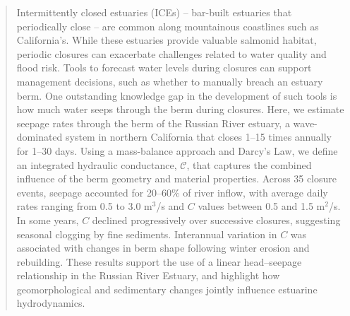 \documentclass[preprint,12pt,authoryear]{elsarticle}
\makeatletter
\providecommand{\DIFaddtex}[1]{{\protect\color{blue}\uwave{#1}}} %
\providecommand{\DIFdeltex}[1]{{\protect\color{red}\sout{#1}}} %
\providecommand{\DIFaddbegin}{} %
\providecommand{\DIFaddend}{} %
\providecommand{\DIFdelbegin}{} %
\providecommand{\DIFdelend}{} %
\providecommand{\DIFadd}[1]{\texorpdfstring{\DIFaddtex{#1}}{#1}} %
\providecommand{\DIFdel}[1]{\texorpdfstring{\DIFdeltex{#1}}{}} %
\newcommand{\DIFscaledelfig}{0.5}
\newlength{\DIFdelgraphicswidth} %
\newlength{\DIFdelgraphicsheight} %
\newcommand{\DIFaddincludegraphics}[2][]{{\color{blue}\fbox{\DIFOincludegraphics[#1]{#2}}}} %
\newcommand{\DIFdelincludegraphics}[2][]{%
\sbox{\DIFdelgraphicsbox}{\DIFOincludegraphics[#1]{#2}}%
\settoboxwidth{\DIFdelgraphicswidth}{\DIFdelgraphicsbox} %
\settoboxtotalheight{\DIFdelgraphicsheight}{\DIFdelgraphicsbox} %
\scalebox{\DIFscaledelfig}{%
\parbox[b]{\DIFdelgraphicswidth}{\usebox{\DIFdelgraphicsbox}\\[-\baselineskip] \rule{\DIFdelgraphicswidth}{0em}}\llap{\resizebox{\DIFdelgraphicswidth}{\DIFdelgraphicsheight}{%
\setlength{\unitlength}{\DIFdelgraphicswidth}%
\begin{picture}(1,1)%
\thicklines\linethickness{2pt} %
{\color[rgb]{1,0,0}\put(0,0){\framebox(1,1){}}}%
{\color[rgb]{1,0,0}\put(0,0){\line( 1,1){1}}}%
{\color[rgb]{1,0,0}\put(0,1){\line(1,-1){1}}}%
\end{picture}%
}\hspace*{3pt}}} %
} %
\DeclareRobustCommand{\DIFaddbegin}{\DIFOaddbegin \let\includegraphics\DIFaddincludegraphics} %
\DeclareRobustCommand{\DIFaddend}{\DIFOaddend \let\includegraphics\DIFOincludegraphics} %
\DeclareRobustCommand{\DIFdelbegin}{\DIFOdelbegin \let\includegraphics\DIFdelincludegraphics} %
\DeclareRobustCommand{\DIFdelend}{\DIFOaddend \let\includegraphics\DIFOincludegraphics} %
\let\sout@orig\sout %
\renewcommand{\sout}[1]{\ifmmode\text{\sout@orig{\ensuremath{#1}}}\else\sout@orig{#1}\fi} %
\makeatother
\begin{document}
\begin{frontmatter}
\begin{abstract}

 
 Intermittently closed estuaries (ICEs) -- bar-built estuaries that periodically close --  are common along mountainous coastlines such as California's. While these estuaries provide valuable salmonid habitat, periodic closures can exacerbate challenges related to water quality and flood risk. Tools to forecast water levels during closures can support management decisions, such as whether to manually breach an estuary berm. One outstanding knowledge gap in the development of such tools is how much water seeps through the berm during closures.
Here, we estimate seepage rates through the berm of the Russian River estuary, a wave-dominated system in northern California that closes 1–15 times annually for 1–30 days. Using a mass-balance approach and Darcy’s Law, we define an integrated hydraulic conductance, \DIFdelbegin \DIFdel{$\mathcal{C}$}\DIFdelend \DIFaddbegin \DIFadd{$C$}\DIFaddend , that captures the combined influence of the berm geometry and material properties. Across 35 closure events, seepage accounted for 20–60\% of river inflow, with average daily rates ranging from 0.5 to 3.0 m$^3$/s and $C$ values between 0.5 and 1.5 m$^2$/s. In some years, $C$ declined progressively over successive closures, suggesting seasonal clogging by fine sediments. Interannual variation in $C$ was associated with changes in berm shape following winter erosion and rebuilding. These results support the use of a linear head–seepage relationship in the Russian River Estuary, and highlight how geomorphological and sedimentary changes jointly influence estuarine hydrodynamics.


\end{abstract}


\end{frontmatter}
\end{document}
